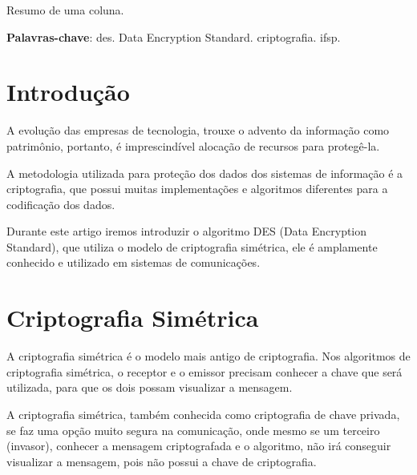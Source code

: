 \documentclass[
	article,			%
	12pt,				%
	oneside,			%
	a4paper,			%
	english,			%
	brazil,				%
	sumario=tradicional
	]{abntex2}
\begin{document}

\frenchspacing

\maketitle

\begin{resumoumacoluna}
 Resumo de uma coluna.
 
 \vspace{\onelineskip}
 
 \noindent
 \textbf{Palavras-chave}: des. Data Encryption Standard. criptografia. ifsp.
\end{resumoumacoluna}

\textual

\section*{Introdução}
\nocite{sistema-des}
\nocite{criptografia-simetrica-assimetrica-cifragem}
\nocite{estudo-descritivo-criptografia}

A evolução das empresas de tecnologia, trouxe o advento da informação como patrimônio, portanto, é imprescindível alocação de recursos para protegê-la.

A metodologia utilizada para proteção dos dados dos sistemas de informação é a criptografia, que possui muitas implementações e algoritmos diferentes para a codificação dos dados.

Durante este artigo iremos introduzir o algoritmo DES (Data Encryption Standard), que utiliza o modelo de criptografia simétrica, ele é amplamente conhecido e utilizado em sistemas de comunicações.

\section{Criptografia Simétrica}

A criptografia simétrica é o modelo mais antigo de criptografia. Nos algoritmos de criptografia simétrica, o receptor e o emissor precisam conhecer a chave que será utilizada, para que os dois possam visualizar a mensagem.

A criptografia simétrica, também conhecida como criptografia de chave privada, se faz uma opção muito segura na comunicação, onde mesmo se um terceiro (invasor), conhecer a mensagem criptografada e o algoritmo, não irá conseguir visualizar a mensagem, pois não possui a chave de criptografia.
\end{document}
